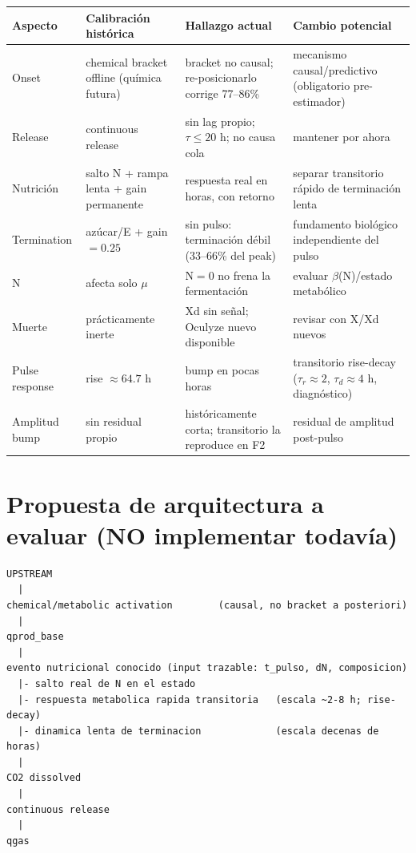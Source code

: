 \documentclass[11pt,a4paper]{article}
\begin{document}
\begin{table}[h]\centering\footnotesize
\begin{tabularx}{\textwidth}{P{1.9cm}P{4.0cm}P{4.4cm}P{4.0cm}}
\toprule
Aspecto & Calibraci\'on hist\'orica & Hallazgo actual & Cambio potencial \\
\midrule
Onset & chemical bracket offline (qu\'imica futura) & bracket no causal; re-posicionarlo corrige 77--86\% & mecanismo causal/predictivo (obligatorio pre-estimador) \\
Release & continuous release & sin lag propio; $\tau\le 20$ h; no causa cola & mantener por ahora \\
Nutrici\'on & salto N + rampa lenta + gain permanente & respuesta real en horas, con retorno & separar transitorio r\'apido de terminaci\'on lenta \\
Termination & az\'ucar/E + gain$=0.25$ & sin pulso: terminaci\'on d\'ebil (33--66\% del peak) & fundamento biol\'ogico independiente del pulso \\
N & afecta solo $\mu$ & N$=0$ no frena la fermentaci\'on & evaluar $\beta$(N)/estado metab\'olico \\
Muerte & pr\'acticamente inerte & Xd sin se\~nal; Oculyze nuevo disponible & revisar con X/Xd nuevos \\
Pulse response & rise $\approx 64.7$ h & bump en pocas horas & transitorio rise-decay ($\tau_r{\approx}2$, $\tau_d{\approx}4$ h, diagn\'ostico) \\
Amplitud bump & sin residual propio & hist\'oricamente corta; transitorio la reproduce en F2 & residual de amplitud post-pulso \\
\bottomrule
\end{tabularx}
\end{table}

\section{Propuesta de arquitectura a evaluar (NO implementar todav\'ia)}

\begin{verbatim}
UPSTREAM
  |
chemical/metabolic activation        (causal, no bracket a posteriori)
  |
qprod_base
  |
evento nutricional conocido (input trazable: t_pulso, dN, composicion)
  |- salto real de N en el estado
  |- respuesta metabolica rapida transitoria   (escala ~2-8 h; rise-decay)
  |- dinamica lenta de terminacion             (escala decenas de horas)
  |
CO2 dissolved
  |
continuous release
  |
qgas
\end{verbatim}
\end{document}
